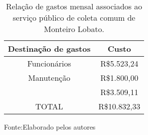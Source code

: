 \begin{table}[htbp]

\begin{center}
\caption{Relação de gastos mensal associados ao serviço público de coleta comum de Monteiro Lobato.}

\begin{tabular}{c|c}
	\rowcolor[rgb]{ .969,  .588,  .275} \textbf{Destinação de gastos} & \textbf{Custo} \\
	\midrule
	\rowcolor[rgb]{ .992,  .914,  .851} Funcionários & R\$5.523,24 \\
	\midrule
	\rowcolor[rgb]{ .976,  .737,  .541} Manutenção & R\$1.800,00 \\
	\midrule
	\rowcolor[rgb]{ .992,  .914,  .851} \multicolumn{1}{|c|}{Transporte} & \multicolumn{1}{c|}{R\$3.509,11} \\
	\midrule
	\rowcolor[rgb]{ .976,  .737,  .541} TOTAL & R\$10.832,33 \\
\end{tabular}%

Fonte:Elaborado pelos autores
\end{center}
\label{tab:gasto_mensal}
\end{table}

